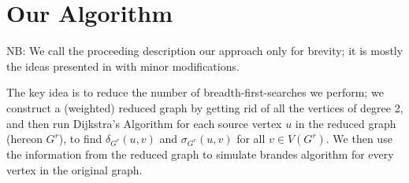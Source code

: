 \section{Our Algorithm}
NB: We call the proceeding description our approach only for brevity; it is
mostly the ideas presented in \cite{pachorkar16} with minor modifications.

The key idea is to reduce the number of breadth-first-searches we perform;
we construct a (weighted) reduced graph by getting rid of all the vertices of
degree 2,
and then run Dijkstra's Algorithm for each source vertex $u$ in the
reduced graph (hereon $G^r$), to find $\delta_{G^r}(u, v)$ and
$\sigma_{G^r}(u, v)$ for all $v \in V(G^r)$.
We then use the information from the reduced graph to simulate brandes
algorithm for every vertex in the original graph.





